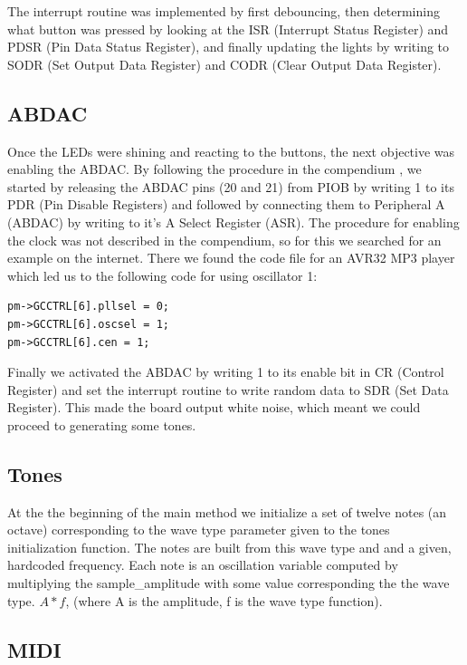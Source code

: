 \documentclass[a4paper,12pt]{article}
\begin{document}
The interrupt routine was implemented by first debouncing, then determining what button was pressed by looking at the ISR (Interrupt Status Register) and PDSR (Pin Data Status Register), and finally updating the lights by writing to SODR (Set Output Data Register) and CODR (Clear Output Data Register).

\subsection{ABDAC}

Once the LEDs were shining and reacting to the buttons, the next objective was enabling the ABDAC. By following the procedure in the compendium \cite{compendium}, we started by releasing the
ABDAC pins (20 and 21) from PIOB by writing 1 to its PDR (Pin Disable Registers) and followed by connecting them to Peripheral A (ABDAC) by writing to it’s A Select Register (ASR). The procedure for enabling the clock was not described in the compendium, so for this we searched for an example on the internet. There we found the code file for an AVR32 MP3 player \cite{clockex} which led us to the following code for using oscillator 1:

\begin{verbatim}
pm->GCCTRL[6].pllsel = 0;
pm->GCCTRL[6].oscsel = 1;
pm->GCCTRL[6].cen = 1;
\end{verbatim}

Finally we activated the ABDAC by writing 1 to its enable bit in CR (Control Register) and set the interrupt routine to write random data to SDR (Set Data Register). This made the board output white noise, which meant we could proceed to generating some tones.

\subsection{Tones}

At the the beginning of the main method we initialize a set of twelve notes (an octave) corresponding to the wave type parameter given to the tones initialization function. The notes are built from this wave type and and a given, hardcoded frequency. Each note is an oscillation variable computed by multiplying the sample\_amplitude with some value corresponding the the wave type. $A * f$, (where A is the amplitude, f is the wave type function).

\subsection{MIDI}
\end{document}
